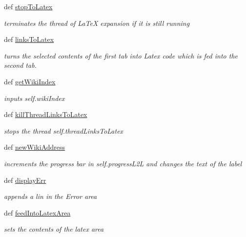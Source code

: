 \begin{DoxyCompactItemize}
def \hyperlink{classuicilibris_1_1w2mMainWindow_afcd6b1cbd2e3c7c49c3eb218e63d74fb}{stop\-To\-Latex}
\begin{DoxyCompactList}\small\item\em terminates the thread of \-La\-Te\-X expansion if it is still running \end{DoxyCompactList}\item 
def \hyperlink{classuicilibris_1_1w2mMainWindow_a1cfdfd4a9daf1a27d3d7f29cacb9f757}{links\-To\-Latex}
\begin{DoxyCompactList}\small\item\em turns the selected contents of the first tab into \-Latex code which is fed into the second tab. \end{DoxyCompactList}\item 
def \hyperlink{classuicilibris_1_1w2mMainWindow_a6717d417cd86ab78b4428a14b5ad4b0c}{get\-Wiki\-Index}
\begin{DoxyCompactList}\small\item\em inputs self.\-wiki\-Index \end{DoxyCompactList}\item 
def \hyperlink{classuicilibris_1_1w2mMainWindow_a3b1c79851802ee6bf2d49d77f779039f}{kill\-Thread\-Links\-To\-Latex}
\begin{DoxyCompactList}\small\item\em stops the thread self.\-thread\-Links\-To\-Latex \end{DoxyCompactList}\item 
def \hyperlink{classuicilibris_1_1w2mMainWindow_a1be02f4f12b50e5ebcd6ecc8f4d9a532}{new\-Wiki\-Address}
\begin{DoxyCompactList}\small\item\em increments the progress bar in self.\-progress\-L2\-L and changes the text of the label \end{DoxyCompactList}\item 
def \hyperlink{classuicilibris_1_1w2mMainWindow_a4f683d705e901227efacd4d3b59da2d7}{display\-Err}
\begin{DoxyCompactList}\small\item\em appends a lin in the \-Error area \end{DoxyCompactList}\item 
def \hyperlink{classuicilibris_1_1w2mMainWindow_ada098421fc13a62937c011086ce8f70a}{feed\-Into\-Latex\-Area}
\begin{DoxyCompactList}\small\item\em sets the contents of the latex area \end{DoxyCompactList}\item 

\end{DoxyCompactItemize}
